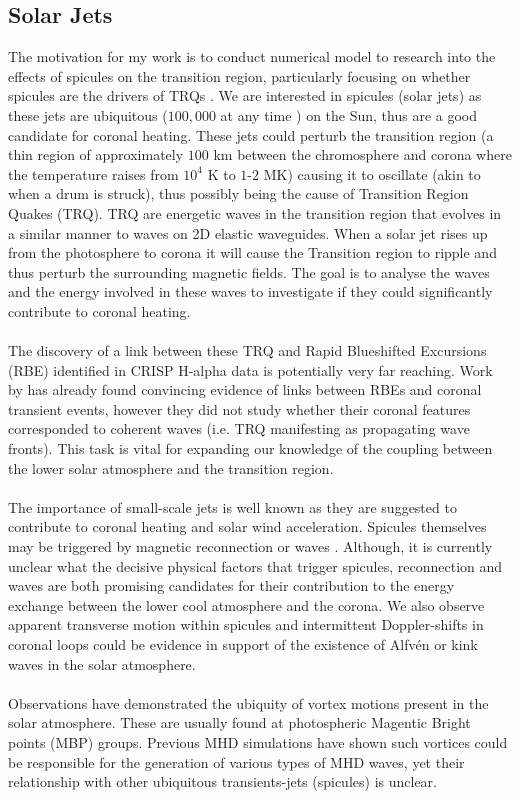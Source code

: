 \documentclass[12pt]{ociamthesis}
\newcommand{\Alfven}{Alfv\'{e}n }
\begin{document}
\subsection{Solar Jets}
The motivation for my work is to conduct numerical model to research into the effects of spicules on the transition region, particularly focusing on whether spicules are the drivers of TRQs \citep{Scullion2011}. We are interested in spicules (solar jets) as these jets are ubiquitous ($100,000$  at  any  time \citep{Beckers1968}) on the Sun, thus are a good candidate for coronal heating. These jets could perturb the transition region (a thin region of approximately $100$ km between the chromosphere and corona where the temperature raises from $10^4$ K to $1$-$2$ MK) causing it to oscillate (akin to when a drum is struck), thus possibly being the cause of Transition Region Quakes (TRQ). TRQ are energetic waves in the transition region that evolves in a similar manner to waves on 2D elastic waveguides. When a solar jet rises up from the photosphere to corona it will cause the Transition region to ripple and thus perturb the surrounding magnetic fields. The goal is to analyse the waves and the energy involved in these waves to investigate if they could significantly contribute to coronal heating. \\ \\ The discovery of a link between these TRQ and Rapid Blueshifted Excursions (RBE) identified in CRISP H-alpha data is potentially very far reaching. Work by \cite{Henriques2016} has already found convincing evidence of links between RBEs and coronal transient events, however they did not study whether their coronal features corresponded to coherent waves (i.e. TRQ manifesting as propagating wave fronts). This task is vital for expanding our knowledge of the coupling between the lower solar atmosphere and the transition region. \\ \\ The importance of small-scale jets is well known as they are suggested to contribute to coronal heating and solar wind acceleration. Spicules themselves may be triggered by magnetic reconnection \citep{Pontieu2007PASJ} or waves \citep{Pontieu2004Natur}. Although, it is currently unclear what the decisive physical factors that trigger spicules, reconnection and waves are both promising candidates for their contribution to the energy exchange between the lower cool atmosphere and the corona. We also observe apparent transverse motion within spicules and intermittent Doppler-shifts in coronal loops could be evidence in support of the existence of \Alfven or kink waves in the solar atmosphere.  \\ \\
Observations have demonstrated the ubiquity of vortex motions present in the solar atmosphere. These are usually found at photospheric Magentic Bright points (MBP) groups. Previous MHD simulations have shown such vortices could be responsible for the generation of various types of MHD waves, yet their relationship with other ubiquitous transients-jets (spicules) is unclear.
\end{document}

